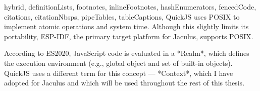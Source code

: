 \begin{markdown*}{%
  hybrid,
  definitionLists,
  footnotes,
  inlineFootnotes,
  hashEnumerators,
  fencedCode,
  citations,
  citationNbsps,
  pipeTables,
  tableCaptions,
}
QuickJS uses POSIX to implement atomic operations and system time. Although this slightly limits its portability, ESP-IDF, the primary target platform for Jaculus, supports POSIX.

According to ES2020, JavaScript code is evaluated in a *Realm*, which defines the execution environment (e.g., global object and set of built-in objects). QuickJS uses a different term for this concept --- *Context*, which I have adopted for Jaculus and which will be used throughout the rest of this thesis.


\end{markdown*}
